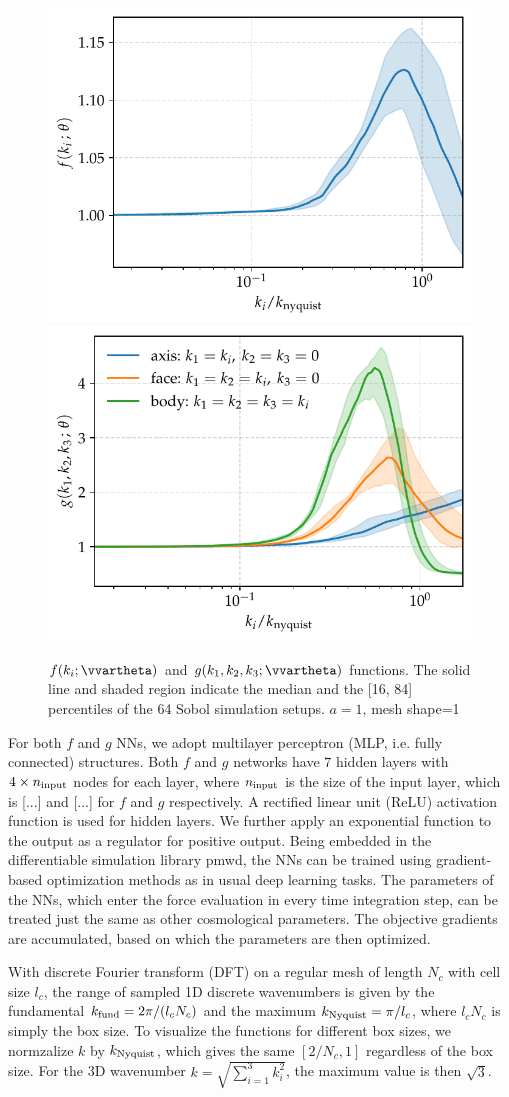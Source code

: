 \documentclass[modern, trackchanges, dvipsnames]{aastex631}
\newcommand{\pmwd}{{\usefont{T1}{nova}{m}{sl}pmwd}}
\begin{document}
\begin{figure}
  \centering
  \includegraphics[width=.48\columnwidth]{net_f_a1_j3091776_e3000.pdf}
  \includegraphics[width=.48\columnwidth]{net_g_a1_j3091776_e3000.pdf}
  \caption{$f(k_i; \vvartheta)$ and $g(k_1, k_2, k_3; \vvartheta)$
  functions. The solid line and shaded region indicate the median and
  the [16, 84] percentiles of the 64 Sobol simulation setups. $a=1$,
  mesh shape=1}
  \label{fig:func}
\end{figure}

For both $f$ and $g$ NNs, we adopt multilayer perceptron (MLP, i.e.
fully connected) structures.
Both $f$ and $g$ networks have $7$ hidden layers with $4\times n_{\rm
input}$ nodes for each layer, where $n_{\rm input}$ is the size of the
input layer, which is [...] and [...] for $f$ and $g$ respectively.
A rectified linear unit (ReLU) activation function is used for hidden
layers.
We further apply an exponential function to the output as a regulator
for positive output.
Being embedded in the differentiable simulation library \pmwd, the NNs
can be trained using gradient-based optimization methods as in usual
deep learning tasks.
The parameters of the NNs, which enter the force evaluation in every
time integration step, can be treated just the same as other
cosmological parameters.
The objective gradients are accumulated, based on which the parameters
are then optimized.

With discrete Fourier transform (DFT) on a regular mesh of length $N_c$
with cell size $l_c$, the range of sampled 1D discrete wavenumbers is
given by the fundamental $k_{\rm fund} = 2\pi/(l_c N_c)$ and the
maximum $k_{\rm Nyquist} = \pi/l_c$, where $l_c N_c$ is simply the box
size.
To visualize the functions for different box sizes, we normzalize $k$ by
$k_{\rm Nyquist}$, which gives the same $[2/N_c, 1]$ regardless of the
box size.
For the 3D wavenumber $k=\sqrt{\sum_{i=1}^{3}k_i^2}$, the maximum value
is then $\sqrt{3}$.
\end{document}

